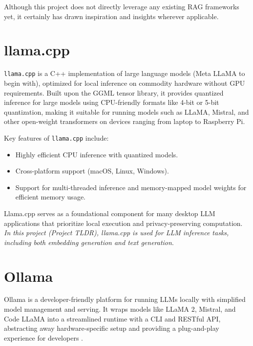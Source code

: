 Although this project does not directly leverage any existing RAG frameworks yet, it certainly has drawn inspiration and insights wherever applicable.

\section{llama.cpp}
\label{sec:llama_cpp}

\texttt{llama.cpp}\cite{gerganov2020llamacpp} is a C++ implementation of large language models (Meta LLaMA to begin with), optimized for local inference on commodity hardware without GPU requirements. Built upon the GGML tensor library, it provides quantized inference for large models using CPU-friendly formats like 4-bit or 5-bit quantization, making it suitable for running models such as LLaMA, Mistral, and other open-weight transformers on devices ranging from laptop to Raspberry Pi.

Key features of \texttt{llama.cpp} include:
\begin{itemize}
    \item Highly efficient CPU inference with quantized models.
    \item Cross-platform support (macOS, Linux, Windows).
    \item Support for multi-threaded inference and memory-mapped model weights for efficient memory usage.
\end{itemize}

Llama.cpp serves as a foundational component for many desktop LLM applications that prioritize local execution and privacy-preserving computation. \textit{In this project (Project TLDR), llama.cpp is used for LLM inference tasks, including both embedding generation and text generation}.

\section{Ollama}
\label{sec:ollama}

Ollama is a developer-friendly platform for running LLMs locally with simplified model management and serving. It wraps models like LLaMA 2, Mistral, and Code LLaMA into a streamlined runtime with a CLI and RESTful API, abstracting away hardware-specific setup and providing a plug-and-play experience for developers \cite{ollama}.

